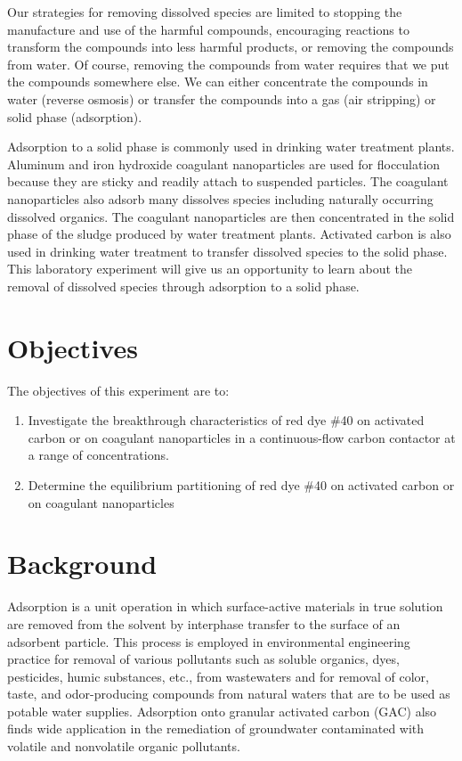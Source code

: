 \documentclass[letterpaper,10pt,english]{sphinxmanual}
\begin{document}
Our strategies for removing dissolved species are limited to stopping the manufacture and use of the harmful compounds, encouraging reactions to transform the compounds into less harmful products, or removing the compounds from water. Of course, removing the compounds from water requires that we put the compounds somewhere else. We can either concentrate the compounds in water (reverse osmosis) or transfer the compounds into a gas (air stripping) or solid phase (adsorption).

Adsorption to a solid phase is commonly used in drinking water treatment plants. Aluminum and iron hydroxide coagulant nanoparticles are used for flocculation because they are sticky and readily attach to suspended particles. The coagulant nanoparticles also adsorb many dissolves species including naturally occurring dissolved organics. The coagulant nanoparticles are then concentrated in the solid phase of the sludge produced by water treatment plants. Activated carbon is also used in drinking water treatment to transfer dissolved species to the solid phase. This laboratory experiment will give us an opportunity to learn about the removal of dissolved species through adsorption to a solid phase.


\section{Objectives}
\label{\detokenize{Adsorption/Adsorption:objectives}}\label{\detokenize{Adsorption/Adsorption:heading-adsorption-objectives}}
The objectives of this experiment are to:
\begin{enumerate}
\item {} 
Investigate the breakthrough characteristics of red dye \#40 on activated carbon or on coagulant nanoparticles in a continuous-flow carbon contactor at a range of concentrations.

\item {} 
Determine the equilibrium partitioning of red dye \#40 on activated carbon or on coagulant nanoparticles

\end{enumerate}


\section{Background}
\label{\detokenize{Adsorption/Adsorption:background}}\label{\detokenize{Adsorption/Adsorption:heading-adsorption-background}}
Adsorption is a unit operation in which surface-active materials in true solution are removed from the solvent by interphase transfer to the surface of an adsorbent particle. This process is employed in environmental engineering practice for removal of various pollutants such as soluble organics, dyes, pesticides, humic substances, etc., from wastewaters and for removal of color, taste, and odor-producing compounds from natural waters that are to be used as potable water supplies. Adsorption onto granular activated carbon (GAC) also finds wide application in the remediation of groundwater contaminated with volatile and nonvolatile organic pollutants.
\end{document}
